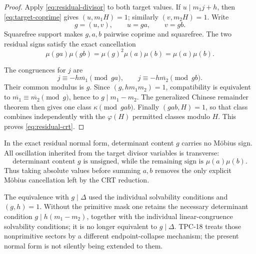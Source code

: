 \begin{proof}
Apply \eqref{eq:residual-divisor} to both target values.  If
\(u\mid m_1j+h\), then \eqref{eq:target-coprime} gives
\((u,m_1H)=1\); similarly \((v,m_2H)=1\).  Write
\[
 g=(u,v),\qquad u=ga,\qquad v=gb.
\]
Squarefree support makes \(g,a,b\) pairwise coprime and squarefree.
The two residual signs satisfy the exact cancellation
\begin{equation}
 \mu(ga)\mu(gb)=\mu(g)^2\mu(a)\mu(b)=\mu(a)\mu(b).
 \label{eq:common-sign-cancel}
\end{equation}

The congruences for \(j\) are
\[
 j\equiv-h\overline{m_1}\pmod{ga},
 \qquad
 j\equiv-h\overline{m_2}\pmod{gb}.
\]
Their common modulus is \(g\).  Since \((g,h m_1m_2)=1\), compatibility
is equivalent to
\(\overline{m_1}\equiv\overline{m_2}\pmod g\), hence to
\(g\mid m_1-m_2\).  The generalized Chinese remainder theorem then
gives one class \(\kappa\pmod{gab}\).  Finally \((gab,H)=1\), so that
class combines independently with the \(\varphi(H)\) permitted classes
modulo \(H\).  This proves \eqref{eq:residual-crt}.
\end{proof}

\begin{corollary}
\label{cor:transverse-parity}
In the exact residual normal form, determinant content \(g\) carries no
M\"obius sign.  All oscillation inherited from the target divisor
variables is transverse:
\begin{equation}
 \boxed{\text{determinant content }g\text{ is unsigned, while the
 remaining sign is }\mu(a)\mu(b).}
 \label{eq:parity-location}
\end{equation}
Thus taking absolute values before summing \(a,b\) removes the only
explicit M\"obius cancellation left by the CRT reduction.
\end{corollary}

\begin{remark}
The equivalence with \(g\mid\Delta\) used the individual solvability
conditions and \((g,h)=1\).  Without the primitive mask one retains the
necessary determinant condition \(g\mid h(m_1-m_2)\), together with
the individual linear-congruence solvability conditions; it is no
longer equivalent to \(g\mid\Delta\).  TPC-18 treats those
nonprimitive sectors by a different endpoint-collapse mechanism; the
present normal form is not silently being extended to them.
\end{remark}
